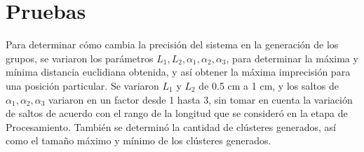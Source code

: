 \section{Pruebas}

Para determinar cómo cambia la precisión del sistema en la generación de los grupos, se variaron los parámetros $L_1, L_2, \alpha_1, \alpha_2, \alpha_3$, para determinar la máxima y mínima distancia euclidiana obtenida, y así obtener la máxima imprecisión para una posición particular. Se variaron $L_1$ y $L_2$ de 0.5 cm a 1 cm, y los saltos de $\alpha_1, \alpha_2, \alpha_3$ variaron en un factor desde 1 hasta 3, sin tomar en cuenta la variación de saltos de acuerdo con el rango de la longitud que se consideró en la etapa de Procesamiento. También se determinó la cantidad de clústeres generados, así como el tamaño máximo y mínimo de los clústeres generados.